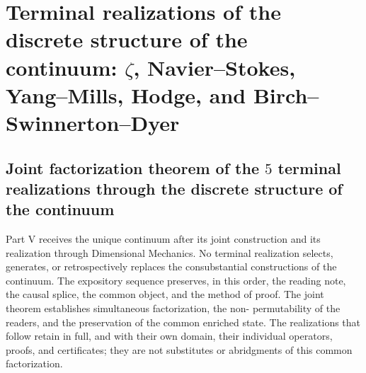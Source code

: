 \makeatletter
{}
\makeatother

\part{Terminal realizations of the discrete structure of the continuum: \texorpdfstring{\(\zeta\)}{zeta}, Navier--Stokes, Yang--Mills, Hodge, and Birch--Swinnerton--Dyer}
\label{part:clausuras-terminales-definitiva}

\HMTFlushCurrentChapter
\chapter{Joint factorization theorem of the \(5\) terminal realizations through the discrete structure of the continuum}
\label{chap:terminal-arquitectura-natural-comun}
Part V receives the unique continuum after its joint construction and
its realization through Dimensional Mechanics. No terminal realization
selects, generates, or retrospectively replaces the consubstantial
constructions of the continuum. The expository sequence preserves, in this order,
the reading note, the causal splice, the common object, and the method of
proof.
The joint theorem establishes simultaneous factorization, the non-
permutability of the readers, and the preservation of the common enriched
state. The realizations that follow retain in full, and with their own
domain, their individual operators, proofs, and certificates; they are not
substitutes or abridgments of this common factorization.

\begingroup
\renewcommand{\chapter}[2][]{}%

\endgroup

